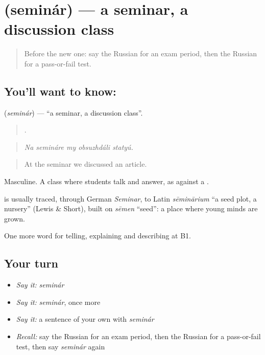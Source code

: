 \section[\texorpdfstring{\ru{семинар} (seminár)}{семинар (seminár)}]{ (seminár) — a seminar, a discussion class}

\label{lesson:RU-C381-seminar}



\begin{quote}
Before the new one: say the Russian for an exam period, then the Russian for a pass-or-fail test.
\end{quote}

\subsection*{You'll want to know: }
\textbf{} (\emph{seminár}) — \textquotedblleft{}a seminar, a discussion class\textquotedblright{}.

\begin{quote}
    .
\end{quote}

\begin{quote}
\emph{Na semináre my obsuzhdáli statyú.}
\end{quote}

\begin{quote}
At the seminar we discussed an article.
\end{quote}

Masculine. A class where students talk and answer, as against a \emph{}.

\begin{cousinweb}
\textbf{} is usually traced, through German \emph{Seminar}, to Latin \emph{sēminārium} \textquotedblleft{}a seed plot, a nursery\textquotedblright{} (Lewis \& Short), built on \emph{sēmen} \textquotedblleft{}seed\textquotedblright{}: a place where young minds are grown.
\end{cousinweb}

\begin{grammarlens}[title={What you've built}]
One more word for telling, explaining and describing at B1.
\end{grammarlens}

\subsection*{Your turn}
\begin{itemize}
\raggedright
  \item \emph{Say it:} \emph{seminár}
  \item \emph{Say it:} \emph{seminár}, once more
  \item \emph{Say it:} a sentence of your own with \emph{seminár}
  \item \emph{Recall:} say the Russian for an exam period, then the Russian for a pass-or-fail test, then say \emph{seminár} again
\end{itemize}

